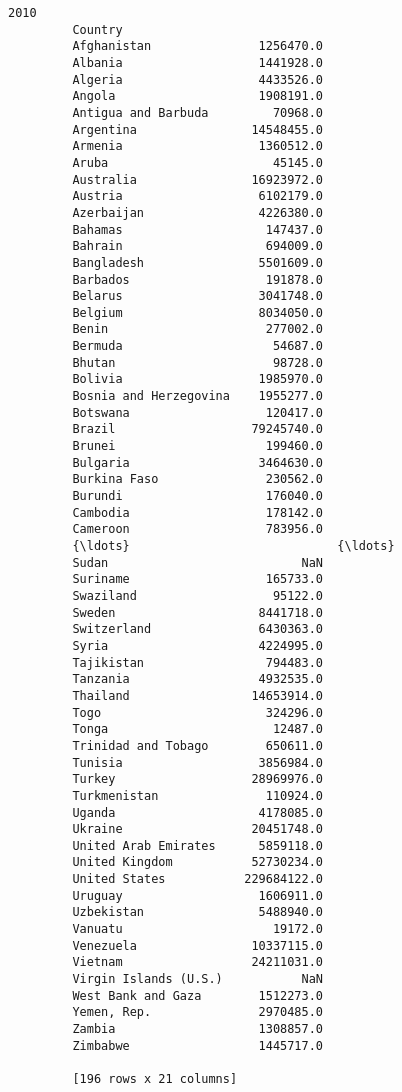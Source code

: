 \documentclass[11pt]{article}
\begin{document}
\begin{Verbatim}[commandchars=\\\{\}]
                                        2010  
         Country                              
         Afghanistan               1256470.0  
         Albania                   1441928.0  
         Algeria                   4433526.0  
         Angola                    1908191.0  
         Antigua and Barbuda         70968.0  
         Argentina                14548455.0  
         Armenia                   1360512.0  
         Aruba                       45145.0  
         Australia                16923972.0  
         Austria                   6102179.0  
         Azerbaijan                4226380.0  
         Bahamas                    147437.0  
         Bahrain                    694009.0  
         Bangladesh                5501609.0  
         Barbados                   191878.0  
         Belarus                   3041748.0  
         Belgium                   8034050.0  
         Benin                      277002.0  
         Bermuda                     54687.0  
         Bhutan                      98728.0  
         Bolivia                   1985970.0  
         Bosnia and Herzegovina    1955277.0  
         Botswana                   120417.0  
         Brazil                   79245740.0  
         Brunei                     199460.0  
         Bulgaria                  3464630.0  
         Burkina Faso               230562.0  
         Burundi                    176040.0  
         Cambodia                   178142.0  
         Cameroon                   783956.0  
         {\ldots}                             {\ldots}  
         Sudan                           NaN  
         Suriname                   165733.0  
         Swaziland                   95122.0  
         Sweden                    8441718.0  
         Switzerland               6430363.0  
         Syria                     4224995.0  
         Tajikistan                 794483.0  
         Tanzania                  4932535.0  
         Thailand                 14653914.0  
         Togo                       324296.0  
         Tonga                       12487.0  
         Trinidad and Tobago        650611.0  
         Tunisia                   3856984.0  
         Turkey                   28969976.0  
         Turkmenistan               110924.0  
         Uganda                    4178085.0  
         Ukraine                  20451748.0  
         United Arab Emirates      5859118.0  
         United Kingdom           52730234.0  
         United States           229684122.0  
         Uruguay                   1606911.0  
         Uzbekistan                5488940.0  
         Vanuatu                     19172.0  
         Venezuela                10337115.0  
         Vietnam                  24211031.0  
         Virgin Islands (U.S.)           NaN  
         West Bank and Gaza        1512273.0  
         Yemen, Rep.               2970485.0  
         Zambia                    1308857.0  
         Zimbabwe                  1445717.0  
         
         [196 rows x 21 columns]
\end{Verbatim}
            
\end{document}

